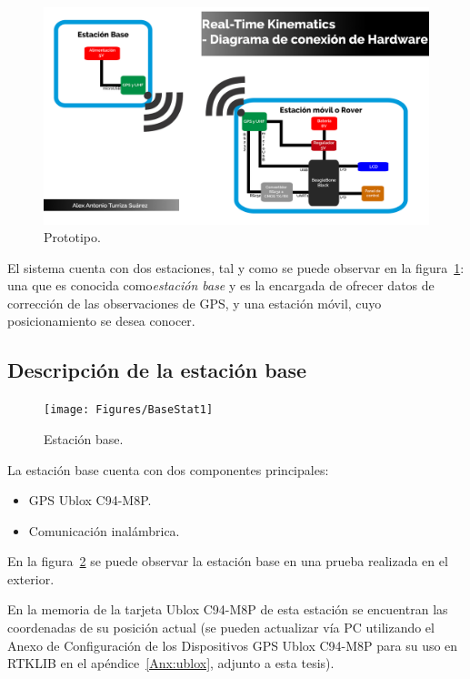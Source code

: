 \begin{figure}[H]
\centering
\includegraphics[scale=0.40]{Figures/DiagFinal}
\caption[Prototipo.]{Prototipo.}
\label{fig:diaghard}
\end{figure}

El sistema cuenta con dos estaciones, tal y como se puede observar en la figura~\ref{fig:diaghard}:  una que es conocida como\textit{estación base} y es la encargada de ofrecer datos de corrección de las observaciones de GPS, y una estación móvil, cuyo posicionamiento se desea conocer. 

\subsection{Descripción de la estación base}

\begin{figure}[H]
\centering
\texttt{[image: Figures/BaseStat1]}
\caption[Estación base.]{Estación base.}
\label{fig:estbase}
\end{figure}

La estación base cuenta con dos componentes principales:

\begin{itemize}
\item GPS Ublox C94-M8P.
\item Comunicación inalámbrica.
\end{itemize}

En la figura~\ref{fig:estbase} se puede observar la estación base en una prueba realizada en el exterior.

En la memoria de la tarjeta Ublox C94-M8P de esta estación se encuentran las coordenadas de su posición actual (se pueden actualizar vía PC utilizando el Anexo de Configuración de los Dispositivos GPS Ublox C94-M8P para su uso en RTKLIB en el apéndice~\ref{Anx:ublox}, adjunto a esta tesis).\\

